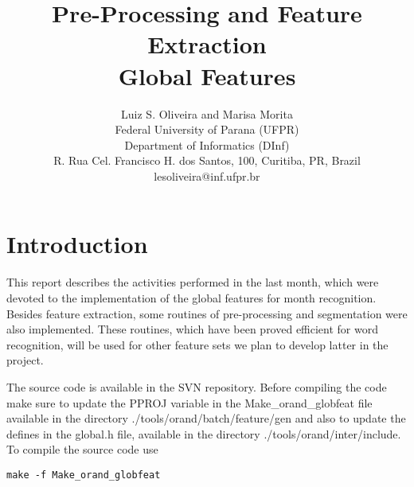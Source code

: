 \documentclass{article}[14pt, oneside, a4paper, times]
\begin{document}
\title{Pre-Processing and Feature Extraction 
\\ \large Global Features}
\author{Luiz S. Oliveira and Marisa Morita  
\\
\vspace {-10pt}
Federal University of Parana (UFPR)\\
\vspace {-10pt}
Department of Informatics (DInf)\\
\vspace {-10pt}
R. Rua Cel. Francisco H. dos Santos, 100, Curitiba, PR, Brazil \\
lesoliveira@inf.ufpr.br \\ 
}


\date{}
\maketitle
\thispagestyle{empty}





\section{Introduction} 

This report describes the activities performed in the last month, which were devoted to the implementation of the global features for month recognition. Besides feature extraction, some routines of pre-processing and segmentation were also implemented. These routines, which have been proved efficient for word recognition, will be used for other feature sets we plan to develop latter in the project. 

The source code is available in the SVN repository. Before compiling the code make sure to update the \textsf{PPROJ} variable in the \textsf{Make\_orand\_globfeat} file available in the directory \textsf{./tools/orand/batch/feature/gen} and also to update the defines in the \textsf{global.h} file, available in the directory \textsf{./tools/orand/inter/include}. To compile the source code use

\begin{verbatim}
make -f Make_orand_globfeat
\end{verbatim}
\end{document}
